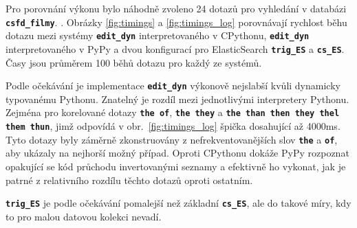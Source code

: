 \documentclass[11pt,letterpaper,oneside,openright]{book}
\newcommand{\bftt}[1]{\texttt{\textbf{#1}}}
\begin{document}
Pro porovnání výkonu bylo náhodně zvoleno 24 dotazů pro vyhledání v databázi
\bftt{csfd\_filmy}.  . Obrázky \ref{fig:timings} a \ref{fig:timings_log}
porovnávají rychlost běhu dotazu mezi systémy \bftt{edit\_dyn} interpretovaného
v CPythonu, \bftt{edit\_dyn} interpretovaného v PyPy a dvou konfigurací pro
ElasticSearch \bftt{trig\_ES} a \bftt{cs\_ES}.  Časy jsou průměrem 100 běhů
dotazu pro každý ze systémů.

Podle očekávání je implementace \bftt{edit\_dyn} výkonově nejslabší kvůli
dynamicky typovanému Pythonu. Znatelný je rozdíl mezi jednotlivými interpretery
Pythonu. Zejména pro korelované dotazy \bftt{the of}, \bftt{the they} a
\bftt{the than then they thel them thun}, jimž odpovídá v
obr.~\ref{fig:timings_log} špička dosahující až 4000ms. Tyto dotazy byly
záměrně zkonstruovány z nefrekventovanějších slov \bftt{the} a \bftt{of}, aby
ukázaly na nejhorší možný případ. Oproti CPythonu dokáže PyPy rozpoznat
opakující se kód průchodu invertovanými seznamy a efektivně ho vykonat, jak je
patrné z relativního rozdílu těchto dotazů oproti ostatním.

\bftt{trig\_ES} je podle očekávání pomalejší než základní \bftt{cs\_ES}, ale do
takové míry, kdy to pro malou datovou kolekci nevadí.
\end{document}
